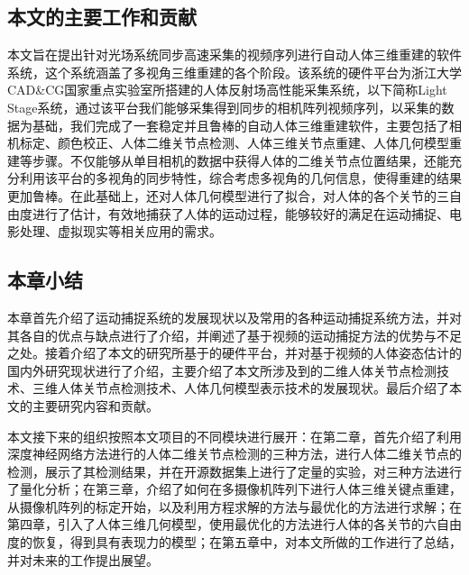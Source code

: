 \subsection{本文的主要工作和贡献}

本文旨在提出针对光场系统同步高速采集的视频序列进行自动人体三维重建的软件系统，这个系统涵盖了多视角三维重建的各个阶段。该系统的硬件平台为浙江大学CAD\&CG国家重点实验室所搭建的人体反射场高性能采集系统，以下简称Light Stage系统，通过该平台我们能够采集得到同步的相机阵列视频序列，以采集的数据为基础，我们完成了一套稳定并且鲁棒的自动人体三维重建软件，主要包括了相机标定、颜色校正、人体二维关节点检测、人体三维关节点重建、人体几何模型重建等步骤。不仅能够从单目相机的数据中获得人体的二维关节点位置结果，还能充分利用该平台的多视角的同步特性，综合考虑多视角的几何信息，使得重建的结果更加鲁棒。在此基础上，还对人体几何模型进行了拟合，对人体的各个关节的三自由度进行了估计，有效地捕获了人体的运动过程，能够较好的满足在运动捕捉、电影处理、虚拟现实等相关应用的需求。

\subsection{本章小结}
本章首先介绍了运动捕捉系统的发展现状以及常用的各种运动捕捉系统方法，并对其各自的优点与缺点进行了介绍，并阐述了基于视频的运动捕捉方法的优势与不足之处。接着介绍了本文的研究所基于的硬件平台，并对基于视频的人体姿态估计的国内外研究现状进行了介绍，主要介绍了本文所涉及到的二维人体关节点检测技术、三维人体关节点检测技术、人体几何模型表示技术的发展现状。最后介绍了本文的主要研究内容和贡献。

本文接下来的组织按照本文项目的不同模块进行展开：在第二章，首先介绍了利用深度神经网络方法进行的人体二维关节点检测的三种方法，进行人体二维关节点的检测，展示了其检测结果，并在开源数据集上进行了定量的实验，对三种方法进行了量化分析；在第三章，介绍了如何在多摄像机阵列下进行人体三维关键点重建，从摄像机阵列的标定开始，以及利用方程求解的方法与最优化的方法进行求解；在第四章，引入了人体三维几何模型，使用最优化的方法进行人体的各关节的六自由度的恢复，得到具有表现力的模型；在第五章中，对本文所做的工作进行了总结，并对未来的工作提出展望。
